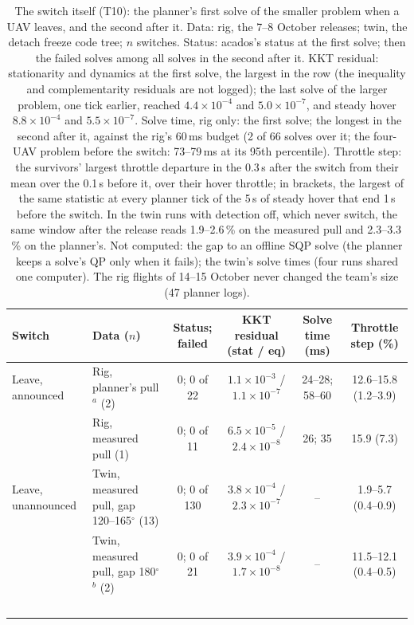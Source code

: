 \begin{table}[htbp]
  \centering
  \footnotesize
  \caption{The switch itself (T10): the planner's first solve of the smaller problem when a UAV leaves, and the second after it. Data: rig, the 7--8 October releases; twin, the detach freeze code tree; $n$ switches. Status: acados's status at the first solve; then the failed solves among all solves in the second after it. KKT residual: stationarity and dynamics at the first solve, the largest in the row (the inequality and complementarity residuals are not logged); the last solve of the larger problem, one tick earlier, reached $4.4\times10^{-4}$ and $5.0\times10^{-7}$, and steady hover $8.8\times10^{-4}$ and $5.5\times10^{-7}$. Solve time, rig only: the first solve; the longest in the second after it, against the rig's 60\,ms budget (2 of 66 solves over it; the four-UAV problem before the switch: 73--79\,ms at its 95th percentile). Throttle step: the survivors' largest throttle departure in the 0.3\,s after the switch from their mean over the 0.1\,s before it, over their hover throttle; in brackets, the largest of the same statistic at every planner tick of the 5\,s of steady hover that end 1\,s before the switch. In the twin runs with detection off, which never switch, the same window after the release reads 1.9--2.6\,\% on the measured pull and 2.3--3.3\,\% on the planner's. Not computed: the gap to an offline SQP solve (the planner keeps a solve's QP only when it fails); the twin's solve times (four runs shared one computer). The rig flights of 14--15 October never changed the team's size (47 planner logs).}
  \label{tab:T10}
  \begin{tabularx}{\textwidth}{>{\raggedright\arraybackslash}p{1.6cm}>{\raggedright\arraybackslash}Xcccc}
    \toprule
    Switch & Data ($n$) & Status; failed & KKT residual (stat / eq) & Solve time (ms) & Throttle step (\%) \\
    \midrule
    Leave, announced & Rig, planner's pull$^a$ (2) & 0; 0 of 22 & $1.1\times10^{-3}$ / $1.1\times10^{-7}$ & 24--28; 58--60 & 12.6--15.8 (1.2--3.9) \\
     & Rig, measured pull (1) & 0; 0 of 11 & $6.5\times10^{-5}$ / $2.4\times10^{-8}$ & 26; 35 & 15.9 (7.3) \\
    Leave, unannounced & Twin, measured pull, gap 120--165$^\circ$ (13) & 0; 0 of 130 & $3.8\times10^{-4}$ / $2.3\times10^{-7}$ & -- & 1.9--5.7 (0.4--0.9) \\
     & Twin, measured pull, gap 180$^\circ$$^b$ (2) & 0; 0 of 21 & $3.9\times10^{-4}$ / $1.7\times10^{-8}$ & -- & 11.5--12.1 (0.4--0.5) \\
$$
\end{tabularx}
\end{table}
